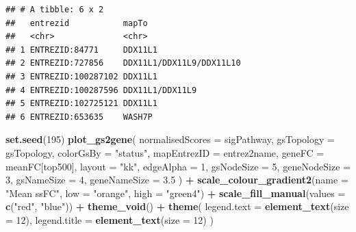 \documentclass[9pt,a4paper,]{extarticle}
\newenvironment{Shaded}{\begin{snugshade}}{\end{snugshade}}
\newcommand{\AttributeTok}[1]{\textcolor[rgb]{0.13,0.29,0.53}{#1}}
\newcommand{\DecValTok}[1]{\textcolor[rgb]{0.00,0.00,0.81}{#1}}
\newcommand{\FloatTok}[1]{\textcolor[rgb]{0.00,0.00,0.81}{#1}}
\newcommand{\FunctionTok}[1]{\textcolor[rgb]{0.13,0.29,0.53}{\textbf{#1}}}
\newcommand{\NormalTok}[1]{#1}
\newcommand{\SpecialCharTok}[1]{\textcolor[rgb]{0.81,0.36,0.00}{\textbf{#1}}}
\newcommand{\StringTok}[1]{\textcolor[rgb]{0.31,0.60,0.02}{#1}}
\begin{document}
\begin{verbatim}
## # A tibble: 6 x 2
##   entrezid           mapTo                   
##   <chr>              <chr>                   
## 1 ENTREZID:84771     DDX11L1                 
## 2 ENTREZID:727856    DDX11L1/DDX11L9/DDX11L10
## 3 ENTREZID:100287102 DDX11L1                 
## 4 ENTREZID:100287596 DDX11L1/DDX11L9         
## 5 ENTREZID:102725121 DDX11L1                 
## 6 ENTREZID:653635    WASH7P
\end{verbatim}

\begin{Shaded}
\begin{Highlighting}[]
\FunctionTok{set.seed}\NormalTok{(}\DecValTok{195}\NormalTok{)}
\FunctionTok{plot\_gs2gene}\NormalTok{(}
  \AttributeTok{normalisedScores =}\NormalTok{ sigPathway, }
  \AttributeTok{gsTopology =}\NormalTok{ gsTopology, }
  \AttributeTok{colorGsBy =} \StringTok{"status"}\NormalTok{, }
  \AttributeTok{mapEntrezID =}\NormalTok{ entrez2name, }
  \AttributeTok{geneFC =}\NormalTok{ meanFC[top500], }
  \AttributeTok{layout =} \StringTok{"kk"}\NormalTok{,}
  \AttributeTok{edgeAlpha =} \DecValTok{1}\NormalTok{, }
  \AttributeTok{gsNodeSize =} \DecValTok{5}\NormalTok{,}
  \AttributeTok{geneNodeSize =} \DecValTok{3}\NormalTok{,}
  \AttributeTok{gsNameSize =} \DecValTok{4}\NormalTok{, }
  \AttributeTok{geneNameSize =} \FloatTok{3.5}
\NormalTok{) }\SpecialCharTok{+}
  \FunctionTok{scale\_colour\_gradient2}\NormalTok{(}\AttributeTok{name =} \StringTok{"Mean ssFC"}\NormalTok{, }\AttributeTok{low =} \StringTok{"orange"}\NormalTok{, }\AttributeTok{high =} \StringTok{"green4"}\NormalTok{) }\SpecialCharTok{+}
  \FunctionTok{scale\_fill\_manual}\NormalTok{(}\AttributeTok{values =} \FunctionTok{c}\NormalTok{(}\StringTok{"red"}\NormalTok{, }\StringTok{"blue"}\NormalTok{)) }\SpecialCharTok{+}
  \FunctionTok{theme\_void}\NormalTok{() }\SpecialCharTok{+}
  \FunctionTok{theme}\NormalTok{(}
    \AttributeTok{legend.text =} \FunctionTok{element\_text}\NormalTok{(}\AttributeTok{size =} \DecValTok{12}\NormalTok{),}
    \AttributeTok{legend.title =} \FunctionTok{element\_text}\NormalTok{(}\AttributeTok{size =} \DecValTok{12}\NormalTok{)}
\NormalTok{  )}
\end{Highlighting}
\end{Shaded}
\end{document}

